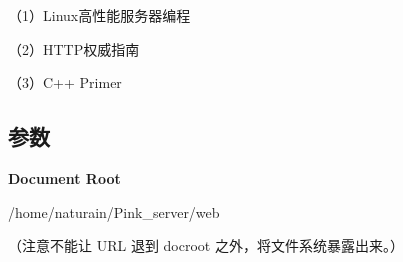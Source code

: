 （1）\+Linux高性能服务器编程

（2）\+H\+T\+T\+P权威指南

（3）\+C++ Primer

\subsection*{参数}


\begin{DoxyItemize}
\item {\bfseries Document Root}
\end{DoxyItemize}

/home/naturain/\+Pink\+\_\+server/web

（注意不能让 U\+RL 退到 docroot 之外，将文件系统暴露出来。） 